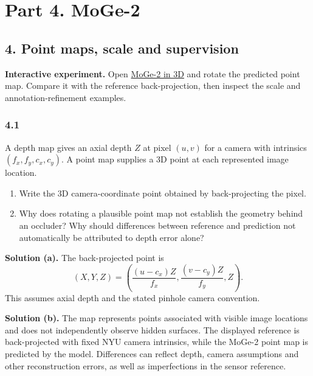 \documentclass[11pt,a4paper]{article}
\newcommand{\laburl}{https://sosekie.github.io/Unibe-CVG-CV-Interactive-Labs/tutorial-11/}
\newcommand{\lablink}[2]{\href{\laburl\##1}{#2}}
\begin{document}
\section*{Part 4. MoGe-2}
\subsection*{4. Point maps, scale and supervision}
\noindent\textbf{Interactive experiment.}
Open \lablink{geometry}{MoGe-2 in 3D} and rotate the predicted point map.
Compare it with the reference back-projection, then inspect the scale and annotation-refinement examples.
\par\noindent
\begin{minipage}{\linewidth}
\subsubsection*{4.1}
A depth map gives an axial depth $Z$ at pixel $(u,v)$ for a camera with intrinsics $(f_x,f_y,c_x,c_y)$.
A point map supplies a 3D point at each represented image location.
\begin{enumerate}[label=(\alph*),nosep]
\item Write the 3D camera-coordinate point obtained by back-projecting the pixel.
\item Why does rotating a plausible point map not establish the geometry behind an occluder?
Why should differences between reference and prediction not automatically be attributed to depth error alone?
\end{enumerate}
\ifsolutions
\noindent\textbf{Solution (a).}
The back-projected point is
\[
(X,Y,Z)=\left(\frac{(u-c_x)Z}{f_x},\frac{(v-c_y)Z}{f_y},Z\right).
\]
This assumes axial depth and the stated pinhole camera convention.

\noindent\textbf{Solution (b).}
The map represents points associated with visible image locations and does not independently observe hidden surfaces.
The displayed reference is back-projected with fixed NYU camera intrinsics, while the MoGe-2 point map is predicted by the model.
Differences can reflect depth, camera assumptions and other reconstruction errors, as well as imperfections in the sensor reference.
\fi
\end{minipage}
\par\medskip
\par\noindent
\end{document}
